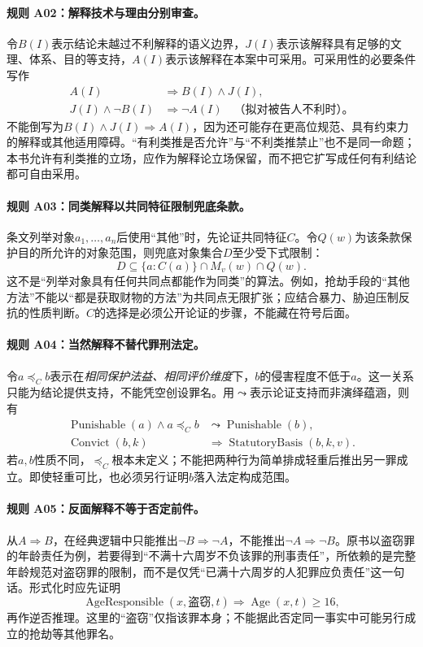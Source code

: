 \paragraph{规则 A02：解释技术与理由分别审查。}
令$B(I)$表示结论未越过不利解释的语义边界，$J(I)$表示该解释具有足够的文理、体系、目的等支持，$A(I)$表示该解释在本案中可采用。可采用性的必要条件写作
\[
\begin{aligned}
A(I)&\Longrightarrow B(I)\land J(I),\\
J(I)\land\neg B(I)&\Longrightarrow\neg A(I)
\quad\text{（拟对被告人不利时）。}
\end{aligned}
\]
不能倒写为$B(I)\land J(I)\Rightarrow A(I)$，因为还可能存在更高位规范、具有约束力的解释或其他适用障碍。“有利类推是否允许”与“不利类推禁止”也不是同一命题；本书允许有利类推的立场，应作为解释论立场保留，而不把它扩写成任何有利结论都可自由采用。

\paragraph{规则 A03：同类解释以共同特征限制兜底条款。}
条文列举对象$a_1,\ldots,a_n$后使用“其他”时，先论证共同特征$C$。令$Q(w)$为该条款保护目的所允许的对象范围，则兜底对象集合$D$至少受下式限制：
\[
D\subseteq\{a:C(a)\}\cap M_v(w)\cap Q(w).
\]
这不是“列举对象具有任何共同点都能作为同类”的算法。例如，抢劫手段的“其他方法”不能以“都是获取财物的方法”为共同点无限扩张；应结合暴力、胁迫压制反抗的性质判断。$C$的选择是必须公开论证的步骤，不能藏在符号后面。

\paragraph{规则 A04：当然解释不替代罪刑法定。}
令$a\preceq_C b$表示在\emph{相同保护法益、相同评价维度}下，$b$的侵害程度不低于$a$。这一关系只能为结论提供支持，不能凭空创设罪名。用$\leadsto$表示论证支持而非演绎蕴涵，则有
\[
\begin{aligned}
\operatorname{Punishable}(a)\land a\preceq_C b
&\leadsto\operatorname{Punishable}(b),\\
\operatorname{Convict}(b,k)&\Longrightarrow
\operatorname{StatutoryBasis}(b,k,v).
\end{aligned}
\]
若$a,b$性质不同，$\preceq_C$根本未定义；不能把两种行为简单排成轻重后推出另一罪成立。即使轻重可比，也必须另行证明$b$落入法定构成范围。

\paragraph{规则 A05：反面解释不等于否定前件。}
从$A\Rightarrow B$，在经典逻辑中只能推出$\neg B\Rightarrow\neg A$，不能推出$\neg A\Rightarrow\neg B$。原书以盗窃罪的年龄责任为例，若要得到“不满十六周岁不负该罪的刑事责任”，所依赖的是完整年龄规范对盗窃罪的限制，而不是仅凭“已满十六周岁的人犯罪应负责任”这一句话。形式化时应先证明
\[
\operatorname{AgeResponsible}(x,\text{盗窃},t)
\Longrightarrow\operatorname{Age}(x,t)\ge16,
\]
再作逆否推理。这里的“盗窃”仅指该罪本身；不能据此否定同一事实中可能另行成立的抢劫等其他罪名。

